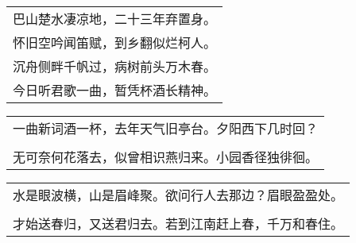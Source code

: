 \noindent\begin{minipage}{\linewidth}
  \vskip-3pt\begin{table}[H]
    \centering
    \begin{tabular}{@{}l@{}}
巴山楚水凄凉地，二十三年弃置身。\\
怀旧空吟闻笛赋，到乡翻似烂柯人。\\
沉舟侧畔千帆过，病树前头万木春。\\
今日听君歌一曲，暂凭杯酒长精神。
    \end{tabular}
  \end{table}
\end{minipage}
\vspace{1cm}


\noindent\begin{minipage}{\linewidth}
  \vskip-3pt\begin{table}[H]
    \centering
    \begin{tabular}{@{}l@{}}
一曲新词酒一杯，去年天气旧亭台。夕阳西下几时回？\\
\\
无可奈何花落去，似曾相识燕归来。小园香径独徘徊。
    \end{tabular}
  \end{table}
\end{minipage}
\vspace{1cm}


\noindent\begin{minipage}{\linewidth}
  \vskip-3pt\begin{table}[H]
    \centering
    \begin{tabular}{@{}l@{}}
水是眼波横，山是眉峰聚。欲问行人去那边？眉眼盈盈处。\\
\\
才始送春归，又送君归去。若到江南赶上春，千万和春住。
    \end{tabular}
  \end{table}
\end{minipage}
\vspace{1cm}


